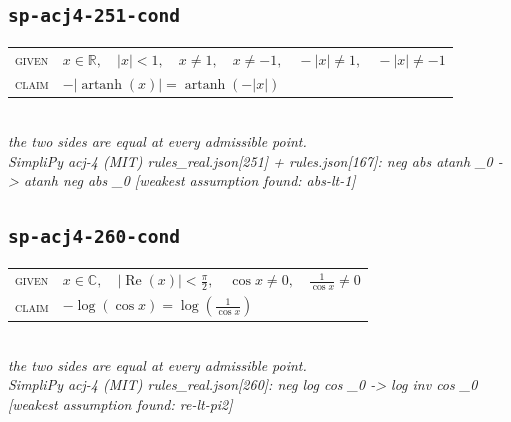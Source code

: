 \documentclass[11pt]{article}
\begin{document}
\subsection*{\texttt{sp-acj4-251-cond}}
\begin{tabular}{@{}l@{\quad}l@{}}
\textsc{given} & $x \in \mathbb{R},\quad \left|x\right| < 1,\quad x \neq 1,\quad x \neq -1,\quad -\left|x\right| \neq 1,\quad -\left|x\right| \neq -1$ \\[4pt]
\textsc{claim} & $\displaystyle -\left|\operatorname{artanh}\left(x\right)\right| = \operatorname{artanh}\left(-\left|x\right|\right)$ \\
\end{tabular}\\[2pt]
{\small\emph{the two sides are equal at every admissible point.}}\\
\emph{SimpliPy acj-4 (MIT) rules\_real.json[251] + rules.json[167]: neg abs atanh \_0  ->  atanh neg abs \_0  [weakest assumption found: abs-lt-1]}\\

\subsection*{\texttt{sp-acj4-260-cond}}
\begin{tabular}{@{}l@{\quad}l@{}}
\textsc{given} & $x \in \mathbb{C},\quad \left|\operatorname{Re}\left(x\right)\right| < \frac{\pi}{2},\quad \cos x \neq 0,\quad \frac{1}{\cos x} \neq 0$ \\[4pt]
\textsc{claim} & $\displaystyle -\log\left(\cos x\right) = \log\left(\frac{1}{\cos x}\right)$ \\
\end{tabular}\\[2pt]
{\small\emph{the two sides are equal at every admissible point.}}\\
\emph{SimpliPy acj-4 (MIT) rules\_real.json[260]: neg log cos \_0  ->  log inv cos \_0  [weakest assumption found: re-lt-pi2]}\\
\end{document}
